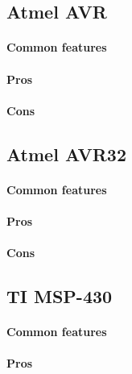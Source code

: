 \documentclass[a4paper,10pt]{article}
\begin{document}
\begin{multicols}{2}
\subsection{Atmel AVR}

\TODO


\paragraph{Common features}
\TODO


\paragraph{Pros}
\TODO


\paragraph{Cons}
\TODO


\subsection{Atmel AVR32}

\TODO


\paragraph{Common features}
\TODO


\paragraph{Pros}
\TODO


\paragraph{Cons}
\TODO


\subsection{TI MSP-430}

\TODO


\paragraph{Common features}
\TODO


\paragraph{Pros}
\TODO



\end{multicols}
\end{document}

